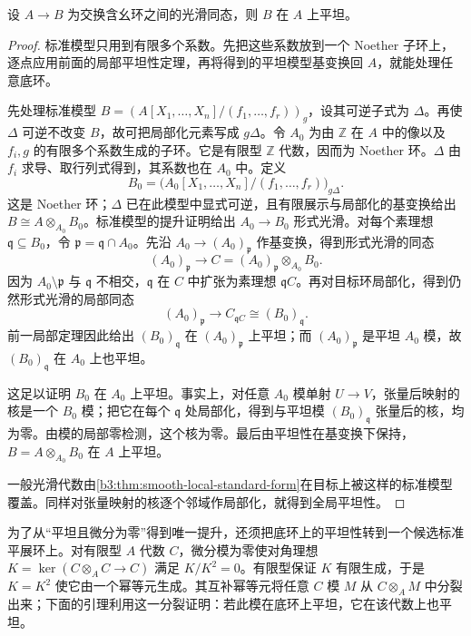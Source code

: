\begin{theorem}\label{b3:thm:smooth-flat}
	设 \(A\to B\) 为交换含幺环之间的光滑同态，则 \(B\) 在 \(A\) 上平坦。
\end{theorem}
\begin{proof}
	标准模型只用到有限多个系数。先把这些系数放到一个 Noether 子环上，逐点应用前面的局部平坦性定理，再将得到的平坦模型基变换回 \(A\)，就能处理任意底环。

	先处理标准模型 \(B=(A[X_1,\ldots,X_n]/(f_1,\ldots,f_r))_g\)，设其可逆子式为 \(\Delta\)。再使 \(\Delta\) 可逆不改变 \(B\)，故可把局部化元素写成 \(g\Delta\)。令 \(A_0\) 为由 \(\mathbb Z\) 在 \(A\) 中的像以及 \(f_i,g\) 的有限多个系数生成的子环。它是有限型 \(\mathbb Z\) 代数，因而为 Noether 环。\(\Delta\) 由 \(f_i\) 求导、取行列式得到，其系数也在 \(A_0\) 中。定义
	\[
		B_0=\bigl(A_0[X_1,\ldots,X_n]/(f_1,\ldots,f_r)\bigr)_{g\Delta}.
	\]
	这是 Noether 环；\(\Delta\) 已在此模型中显式可逆，且有限展示与局部化的基变换给出 \(B\cong A\otimes_{A_0}B_0\)。标准模型的提升证明给出 \(A_0\to B_0\) 形式光滑。对每个素理想 \(\mathfrak q\subseteq B_0\)，令 \(\mathfrak p=\mathfrak q\cap A_0\)。先沿 \(A_0\to(A_0)_{\mathfrak p}\) 作基变换，得到形式光滑的同态
	\[
		(A_0)_{\mathfrak p}\longrightarrow C=(A_0)_{\mathfrak p}\otimes_{A_0}B_0.
	\]
	因为 \(A_0\setminus\mathfrak p\) 与 \(\mathfrak q\) 不相交，\(\mathfrak q\) 在 \(C\) 中扩张为素理想 \(\mathfrak qC\)。再对目标环局部化，得到仍然形式光滑的局部同态
	\[
		(A_0)_{\mathfrak p}\longrightarrow C_{\mathfrak qC}\cong(B_0)_{\mathfrak q}.
	\]
	前一局部定理因此给出 \((B_0)_{\mathfrak q}\) 在 \((A_0)_{\mathfrak p}\) 上平坦；而 \((A_0)_{\mathfrak p}\) 是平坦 \(A_0\) 模，故 \((B_0)_{\mathfrak q}\) 在 \(A_0\) 上也平坦。

	这足以证明 \(B_0\) 在 \(A_0\) 上平坦。事实上，对任意 \(A_0\) 模单射 \(U\to V\)，张量后映射的核是一个 \(B_0\) 模；把它在每个 \(\mathfrak q\) 处局部化，得到与平坦模 \((B_0)_{\mathfrak q}\) 张量后的核，均为零。由模的局部零检测，这个核为零。最后由平坦性在基变换下保持，\(B=A\otimes_{A_0}B_0\) 在 \(A\) 上平坦。

	一般光滑代数由\cref{b3:thm:smooth-local-standard-form}在目标上被这样的标准模型覆盖。同样对张量映射的核逐个邻域作局部化，就得到全局平坦性。
\end{proof}

为了从“平坦且微分为零”得到唯一提升，还须把底环上的平坦性转到一个候选标准平展环上。对有限型 \(A\) 代数 \(C\)，微分模为零使对角理想 \(K=\ker(C\otimes_AC\to C)\) 满足 \(K/K^2=0\)。有限型保证 \(K\) 有限生成，于是 \(K=K^2\) 使它由一个幂等元生成。其互补幂等元将任意 \(C\) 模 \(M\) 从 \(C\otimes_AM\) 中分裂出来；下面的引理利用这一分裂证明：若此模在底环上平坦，它在该代数上也平坦。

